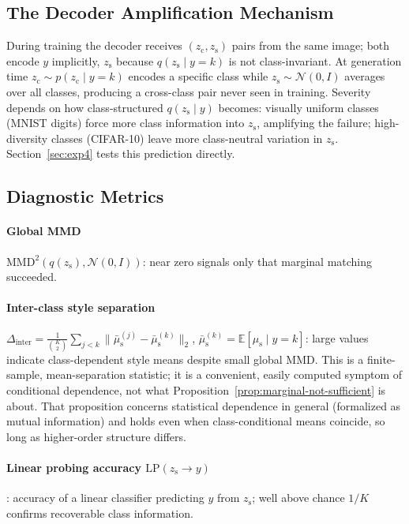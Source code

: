 \documentclass[10pt,letterpaper]{article}
\newcommand{\zc}{z_{\mathrm{c}}}
\newcommand{\zs}{z_{\mathrm{s}}}
\newcommand{\mus}{\mu_{\mathrm{s}}}
\newcommand{\MMD}{\mathrm{MMD}}
\begin{document}
\subsection{The Decoder Amplification Mechanism}
\label{sec:mechanism}

During training the decoder receives $(\zc,\zs)$ pairs from the same image;
both encode $y$ implicitly, $\zs$ because $q(\zs\mid y{=}k)$ is not
class-invariant. At generation time $\zc\sim p(\zc\mid y{=}k)$ encodes a
specific class while $\zs\sim\mathcal{N}(0,I)$ averages over all classes,
producing a cross-class pair never seen in training. Severity depends on how
class-structured $q(\zs\mid y)$ becomes: visually uniform classes (MNIST
digits) force more class information into $\zs$, amplifying the failure;
high-diversity classes (CIFAR-10) leave more class-neutral variation in
$\zs$. Section~\ref{sec:exp4} tests this prediction directly.

\subsection{Diagnostic Metrics}
\label{sec:diagnostics}

\paragraph{Global MMD} $\MMD^2(q(\zs),\mathcal{N}(0,I))$: near zero signals
only that marginal matching succeeded.

\paragraph{Inter-class style separation}
$\Delta_{\mathrm{inter}}=\frac{1}{\binom{K}{2}}\sum_{j<k}\|\bar\mus^{(j)}-\bar\mus^{(k)}\|_2$,
$\bar\mus^{(k)}=\mathbb{E}[\mus\mid y{=}k]$: large values indicate
class-dependent style means despite small global MMD. This is a
finite-sample, mean-separation statistic; it is a convenient, easily
computed symptom of conditional dependence, not what
Proposition~\ref{prop:marginal-not-sufficient} is about. That proposition
concerns statistical dependence in general (formalized as mutual
information) and holds even when class-conditional means coincide, so long
as higher-order structure differs.

\paragraph{Linear probing accuracy $\mathrm{LP}(\zs\to y)$}: accuracy of a
linear classifier predicting $y$ from $\zs$; well above chance $1/K$
confirms recoverable class information.
\end{document}
